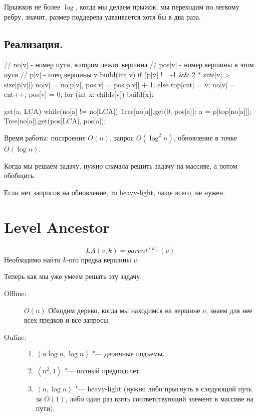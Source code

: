 Прыжков не более $\log$, когда мы делаем прыжок, мы переходим по легкому ребру, значит, размер поддерева удваивается хотя бы в два раза.

\subsection{Реализация.}

\begin{cppcode}
// no[v] - номер пути, котором лежит вершина
// pos[v] - номер вершины в этом пути
// p[v] - отец вершины v
build(int v) {
	if (p[v] != -1 && 2 * size[v] > size[p[v]]) {
		no[v] = no[p[v], pos[v] = pos[p[v]] + 1;
	} else {
		top[cnt] = v;
		no[v] = cnt++;
		pos[v] = 0;
	}
	for (int x: childs[v])
		build(x);
}

get(a, LCA) {
	while(no[a] != no[LCA]) {
		Tree[no[a]].get(0, pos[a]);
		a = p[top[no[a]]];
	}
	Tree[no[a]].get(pos[LCA], pos[a]);
}
\end{cppcode}

Время работы: построение $O(n)$, запрос $O(\log^2 n)$, обновление в точке $O(\log n)$.

\begin{Rem}
	Когда мы решаем задачу, нужно сначала решить задачу на массиве, а потом обобщить.
\end{Rem}

Если нет запросов на обновление, то heavy-light, чаще всего, не нужен.

\section{Level Ancestor}

\begin{Def}
	\[ LA(v, k) = parent^{(k)}(v) \]
	Необходимо найти $k$-ого предка вершины $v$.
\end{Def}

Теперь как мы уже умеем решать эту задачу.
\begin{description}
\item[Offline:]
	$O(n)$
	Обходим дерево, когда мы находимся на вершине $v$, знаем для нее всех предков и все запросы.

\item[Online:]
	\begin{enumerate}
	\item
		$\left<n\log n, \log n\right>$ "--- двоичные подъемы.

	\item
		$\left<n^2, 1\right>$ "--- полный предподсчет.

	\item
		$\left<n, \log n\right>$ "--- heavy-light (нужно либо прыгнуть в следующий путь за $O(1)$,
		либо один раз взять соответствующий элемент в массиве на пути).
	\end{enumerate}
\end{description}

